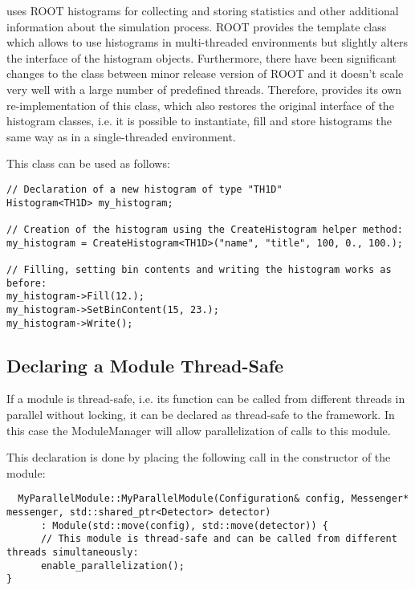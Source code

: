 \apsq uses ROOT histograms for collecting and storing statistics and other additional information about the simulation process.
ROOT provides the template class  which allows to use histograms in multi-threaded environments but slightly alters the interface of the histogram objects.
Furthermore, there have been significant changes to the class between minor release version of ROOT and it doesn't scale very well with a large number of predefined threads.
Therefore, \apsq provides its own re-implementation of this class,  which also restores the original interface of the histogram classes, i.e. it is possible to instantiate, fill and store histograms the same way as in a single-threaded environment.

This class can be used as follows:
\begin{verbatim}
// Declaration of a new histogram of type "TH1D"
Histogram<TH1D> my_histogram;

// Creation of the histogram using the CreateHistogram helper method:
my_histogram = CreateHistogram<TH1D>("name", "title", 100, 0., 100.);

// Filling, setting bin contents and writing the histogram works as before:
my_histogram->Fill(12.);
my_histogram->SetBinContent(15, 23.);
my_histogram->Write();
\end{verbatim}

\subsection{Declaring a Module Thread-Safe}

If a module is thread-safe, i.e. its  function can be called from different threads in parallel without locking, it can be declared as thread-safe to the framework.
In this case the ModuleManager will allow parallelization of calls to this module.

This declaration is done by placing the following call in the constructor of the module:
\begin{verbatim}
  MyParallelModule::MyParallelModule(Configuration& config, Messenger* messenger, std::shared_ptr<Detector> detector)
      : Module(std::move(config), std::move(detector)) {
      // This module is thread-safe and can be called from different threads simultaneously:
      enable_parallelization();
}
\end{verbatim}

